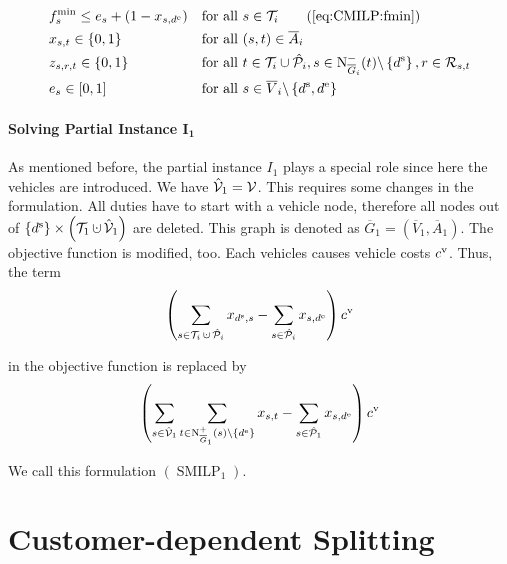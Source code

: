 \begin{align}
	& f^{\min}_s \leq e_s + \left(1-x_{s,\de}\right) && \text{for all } s\in\Ti \tag{\ref{eq:CMILP:fmin}} \\
	& x_{s,t}\in\{0,1\} & & \text{for all } (s,t)\in\overline{A}_i \label{eq:CMILP:xst} \\
	& z_{s,r,t}\in\{0,1\} & & \text{for all } t\in\Ti\cup\Phat_i,s\in\Ninoi(t)\backslash\left\{\ds\right\},r\in\Rst \label{eq:CMILP:zsrt} \\
	& e_s\in[0,1] & & \text{for all } s\in\overline{V}_i\backslash\left\{\ds,\de\right\} \label{eq:CMILP:es}
\end{align}

\paragraph{Solving Partial Instance $\boldsymbol{I_1}$} \parfill

As mentioned before, the partial instance $I_1$ plays a special role since here the vehicles are introduced. We have ${\hat{\mathcal{V}}_1=\mathcal{V}}$. This requires some changes in the formulation. All duties have to start with a vehicle node, therefore all nodes out of ${\left\{\ds\right\}\times\left(\mathcal{T}_1\cupdot\Vhat_1\right)}$ are deleted. This graph is denoted as ${\overline{G}_1 = \left(\overline{V}_1,\overline{A}_1\right)}$.
The objective function is modified, too. Each vehicles causes vehicle costs $c^{\operatorname{v}}$. Thus, the term 
\begin{align*}
	\left(\sum_{s\in\Ti\cupdot\Phat_i} x_{\ds,s} - \sum_{s\in\Phat_i} x_{s,\de}\right)\cv
\end{align*}

in the objective function is replaced by
\begin{align*}
	\left(\sum_{s\in\hat{\mathcal{V}}_1} \sum_{t\in\operatorname{N}^+_{\overline{G}_1}(s)\backslash\left\{d^{\operatorname{e}}\right\}} x_{s,t} - \sum_{s\in\hat{\mathcal{P}}_1} x_{s,d^{\operatorname{e}}}\right)c^{\operatorname{v}}
\end{align*}

We call this formulation $(\operatorname{SMILP}_1)$.


\section{Customer-dependent Splitting}
\label{sec:customer_dependent_splitting}

